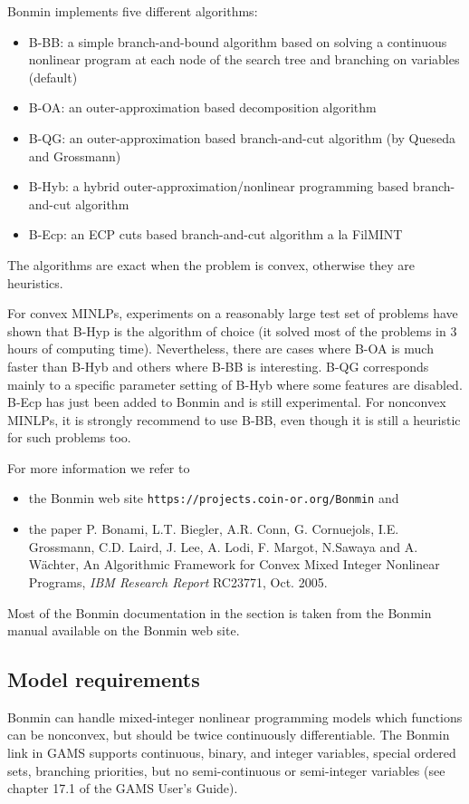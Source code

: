Bonmin implements five different algorithms:
\begin{itemize}
\item {B-BB}: a simple branch-and-bound algorithm based on solving a continuous nonlinear program at each node of the search tree and branching on variables (default)
\item {B-OA}: an outer-approximation based decomposition algorithm
\item {B-QG}: an outer-approximation based branch-and-cut algorithm (by Queseda and Grossmann)
\item {B-Hyb}: a hybrid outer-approximation/nonlinear programming based branch-and-cut algorithm
\item {B-Ecp}: an ECP cuts based branch-and-cut algorithm a la FilMINT
\end{itemize}
The algorithms are exact when the problem is convex, otherwise they are heuristics.

For convex MINLPs, experiments on a reasonably large test set of problems have shown that B-Hyp is the algorithm of choice (it solved most of the problems in 3 hours of computing time).
Nevertheless, there are cases where B-OA is much faster than B-Hyb and others where B-BB is interesting.
B-QG corresponds mainly to a specific parameter setting of B-Hyb where some features are disabled.
B-Ecp has just been added to Bonmin and is still experimental.
For nonconvex MINLPs, it is strongly recommend to use B-BB, even though it is still a heuristic for such problems too.

For more information we refer to
\begin{itemize}
\item the Bonmin web site \texttt{https://projects.coin-or.org/Bonmin} and
\item the paper P. Bonami, L.T. Biegler, A.R. Conn, G. Cornuejols, I.E. Grossmann, C.D. Laird, J. Lee, A. Lodi, F. Margot, N.Sawaya and A. W\"achter, An Algorithmic Framework for Convex Mixed Integer Nonlinear Programs, \emph{IBM Research Report} RC23771, Oct. 2005.
\end{itemize}
Most of the Bonmin documentation in the section is taken from the Bonmin manual available on the Bonmin web site.

\subsection{Model requirements}

Bonmin can handle mixed-integer nonlinear programming models which functions can be nonconvex, but should be twice continuously differentiable.
The Bonmin link in GAMS supports continuous, binary, and integer variables, special ordered sets, branching priorities, but no semi-continuous or semi-integer variables (see chapter 17.1 of the GAMS User's Guide).

